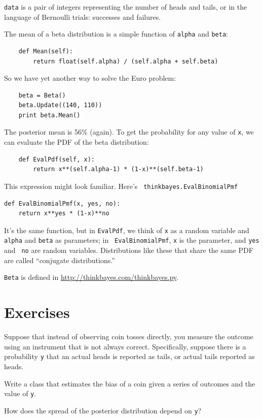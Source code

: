 \documentclass[12pt]{book}
\begin{document}
{\tt data} is a pair of integers representing the number of
heads and tails, or in the language of Bernoulli trials: successes
and failures.

The mean of a beta distribution is a simple function of {\tt alpha}
and {\tt beta}:

\begin{verbatim}
    def Mean(self):
        return float(self.alpha) / (self.alpha + self.beta)
\end{verbatim}

So we have yet another way to solve the Euro problem:

\begin{verbatim}
    beta = Beta()
    beta.Update((140, 110))
    print beta.Mean()
\end{verbatim}

The posterior mean is 56\% (again).  To get the probability for
any value of {\tt x}, we can evaluate the PDF of the beta
distribution:

\begin{verbatim}
    def EvalPdf(self, x):
        return x**(self.alpha-1) * (1-x)**(self.beta-1)
\end{verbatim}

This expression might look familiar.  Here's {\tt
  thinkbayes.EvalBinomialPmf}

\begin{verbatim}
def EvalBinomialPmf(x, yes, no): 
    return x**yes * (1-x)**no
\end{verbatim}

It's the same function, but in {\tt EvalPdf}, we think of {\tt x} as a
random variable and {\tt alpha} and {\tt beta} as parameters; in {\tt
  EvalBinomialPmf}, {\tt x} is the parameter, and {\tt yes} and {\tt
  no} are random variables.  Distributions like these that share the
same PDF are called ``conjugate distributions.''

{\tt Beta} is defined in \url{http://thinkbayes.com/thinkbayes.py}.


\section{Exercises}

\begin{exercise}

Suppose that instead of observing coin tosses directly, you measure
the outcome using an instrument that is not always correct.  Specifically,
suppose there is a probability {\tt y} that an actual heads is reported
as tails, or actual tails reported as heads.

Write a class that estimates the bias of a coin given a series of
outcomes and the value of {\tt y}.

How does the spread of the posterior distribution depend on
{\tt y}?

\end{exercise}
\end{document}
